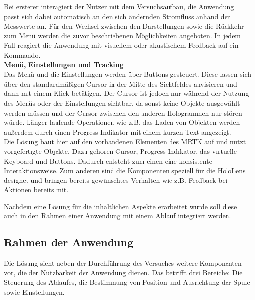 Bei ersterer interagiert der Nutzer mit dem Versuchsaufbau, die Anwendung passt sich dabei automatisch an den sich ändernden Stromfluss anhand der Messwerte an. Für den Wechsel zwischen den Darstellungen sowie die Rückkehr zum Menü werden die zuvor beschriebenen Möglichkeiten angeboten. In jedem Fall reagiert die Anwendung mit visuellem oder akustischem Feedback auf ein Kommando.\\

\textbf{Menü, Einstellungen und Tracking}\\
Das Menü und die Einstellungen werden über Buttons gesteuert. Diese lassen sich über den standardmäßigen Cursor in der Mitte des Sichtfeldes anvisieren und dann mit einem Klick betätigen. Der Cursor ist jedoch nur während der Nutzung des Menüs oder der Einstellungen sichtbar, da sonst keine Objekte ausgewählt werden müssen und der Cursor zwischen den anderen Hologrammen nur stören würde. Länger laufende Operationen wie z.B. das Laden von Objekten werden außerdem durch einen Progress Indikator mit einem kurzen Text angezeigt.\\

Die Lösung baut hier auf den vorhandenen Elementen des MRTK auf und nutzt vorgefertigte Objekte. Dazu gehören Cursor, Progress Indikator, das virtuelle Keyboard und Buttons. Dadurch entsteht zum einen eine konsistente Interaktionsweise. Zum anderen sind die Komponenten speziell für die HoloLens designet und bringen bereits gewünschtes Verhalten wie z.B. Feedback bei Aktionen bereits mit.

Nachdem eine Lösung für die inhaltlichen Aspekte erarbeitet wurde soll diese auch in den Rahmen einer Anwendung mit einem Ablauf integriert werden.

\subsection{Rahmen der Anwendung}
\label{sec-4-3}
Die Lösung sieht neben der Durchführung des Versuches weitere Komponenten vor, die der Nutzbarkeit der Anwendung dienen. Das betrifft drei Bereiche: Die Steuerung des Ablaufes, die Bestimmung von Position und Ausrichtung der Spule sowie Einstellungen.

